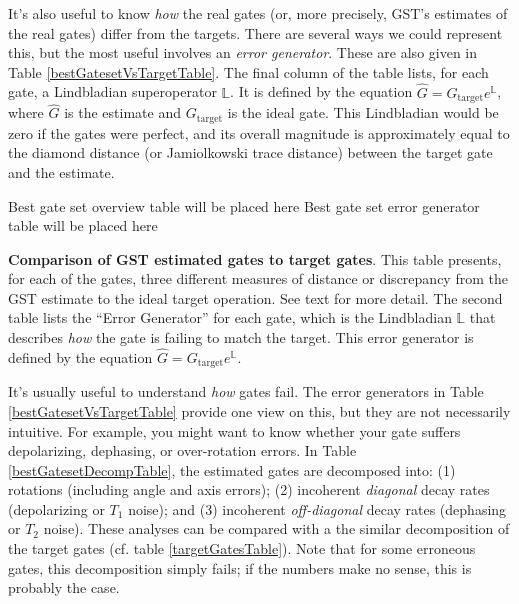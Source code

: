 \documentclass{article}[11pt]
\newcommand{\putfield}[2]{#2}
\begin{document}
It's also useful to know \emph{how} the real gates (or, more precisely, GST's estimates of the real gates) differ from the targets.  There are several ways we could represent this, but the most useful involves an \emph{error generator}.  These are also given in Table \ref{bestGatesetVsTargetTable}.  The final column of the table lists, for each gate, a Lindbladian superoperator $\mathbb{L}$.  It is defined by the equation $\hat{G} = G_{\mathrm{target}}e^{\mathbb{L}}$, where $\hat{G}$ is the estimate and $G_{\mathrm{target}}$ is the ideal gate.  This Lindbladian would be zero if the gates were perfect, and its overall magnitude is approximately equal to the diamond distance (or Jamiolkowski trace distance) between the target gate and the estimate.

\begin{table}[h]
\begin{center}
\putfield{bestGatesetVsTargetTable}{Best gate set overview table will be placed here}
\vspace{2em}
\putfield{bestGatesetErrorGenTable}{Best gate set error generator table will be placed here}
\caption{\putfield{tt_bestGatesetVsTargetTable}{}\putfield{tt_bestGatesetErrorGenTable}{}\textbf{Comparison of GST estimated gates to target gates}.  This table presents, for each of the gates, three different measures of distance or discrepancy from the GST estimate to the ideal target operation.  See text for more detail.  The second table lists the ``Error Generator'' for each gate, which is the Lindbladian $\mathbb{L}$ that describes \emph{how} the gate is failing to match the target.  This error generator is defined by the equation $\hat{G} = G_{\mathrm{target}}e^{\mathbb{L}}$. \label{bestGatesetVsTargetTable}}
\end{center}
\end{table}

It's usually useful to understand \emph{how} gates fail.  The error generators in Table \ref{bestGatesetVsTargetTable} provide one view on this, but they are not necessarily intuitive.   For example, you might want to know whether your gate suffers depolarizing, dephasing, or over-rotation errors.  In Table \ref{bestGatesetDecompTable}, the estimated gates are decomposed into: (1) rotations (including angle and axis errors); (2) incoherent \emph{diagonal} decay rates (depolarizing or $T_1$ noise); and (3) incoherent \emph{off-diagonal} decay rates (dephasing or $T_2$ noise).  These analyses can be compared with a the similar decomposition of the target gates (cf. table \ref{targetGatesTable}).  Note that for some erroneous gates, this decomposition simply fails; if the numbers make no sense, this is probably the case.
\end{document}
